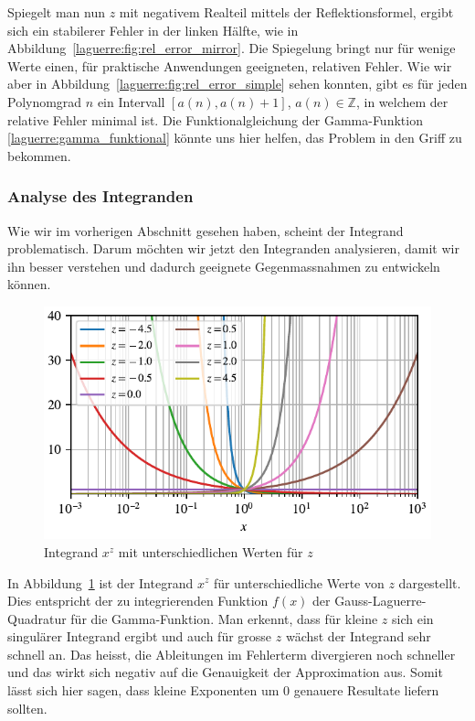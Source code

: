 Spiegelt man nun $z$ mit negativem Realteil mittels der Reflektionsformel,
ergibt sich ein stabilerer Fehler in der linken Hälfte,
wie in Abbildung~\ref{laguerre:fig:rel_error_mirror}.
Die Spiegelung bringt nur für wenige Werte einen,
für praktische Anwendungen geeigneten,
relativen Fehler.
Wie wir aber in Abbildung~\ref{laguerre:fig:rel_error_simple} sehen konnten,
gibt es für jeden Polynomgrad $n$ ein Intervall $[a(n), a(n) + 1]$,
$a(n) \in \mathbb{Z}$,
in welchem der relative Fehler minimal ist.
Die Funktionalgleichung der Gamma-Funktion \eqref{laguerre:gamma_funktional}
könnte uns hier helfen,
das Problem in den Griff zu bekommen.

\subsubsection{Analyse des Integranden}
Wie wir im vorherigen Abschnitt gesehen haben,
scheint der Integrand problematisch.
Darum möchten wir jetzt den Integranden analysieren,
damit wir ihn besser verstehen und
dadurch geeignete Gegenmassnahmen zu entwickeln können.

\begin{figure}
\centering
% 
\includegraphics{papers/laguerre/images/integrand.pdf}
\caption{Integrand $x^z$ mit unterschiedlichen Werten für $z$}
\label{laguerre:fig:integrand}
\end{figure}

In Abbildung~\ref{laguerre:fig:integrand} ist der Integrand $x^z$ für
unterschiedliche Werte von $z$ dargestellt.
Dies entspricht der zu integrierenden Funktion $f(x)$
der Gauss-Laguerre-Quadratur für die Gamma-Funktion.
Man erkennt,
dass für kleine $z$ sich ein singulärer Integrand ergibt
und auch für grosse $z$ wächst der Integrand sehr schnell an.
Das heisst,
die Ableitungen im Fehlerterm divergieren noch schneller
und das wirkt sich negativ auf die Genauigkeit der Approximation aus.
Somit lässt sich hier sagen,
dass kleine Exponenten um $0$ genauere Resultate liefern sollten.

